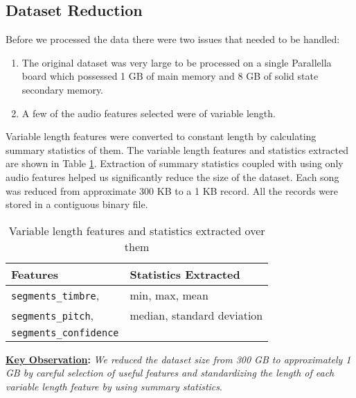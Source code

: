 \subsection{Dataset Reduction}
\label{subsec: meth_dataset_reduc}
Before we processed the data there were two issues that needed to be handled:
\begin{enumerate}
\item The original dataset was very large to be processed on a single Parallella board which possessed 1 GB of main memory and 8 GB of solid state secondary memory.
\item A few of the audio features selected were of variable length.
\end{enumerate}
Variable length features were converted to constant length by calculating summary statistics of them. The variable length features and statistics extracted are shown in Table \ref{table:varLenFeature_stats}. Extraction of summary statistics coupled with using only audio features helped us significantly reduce the size of the dataset. Each song was reduced from approximate 300 KB to a 1 KB record. All the records were stored in a contiguous binary file.
\begin{table}
\begin{center}
\begin{tabular}{| l | l |}
\hline
\textbf{Features} & \textbf{Statistics Extracted} \\
\hline
\texttt{segments\_timbre}, & min, max, mean\\
\texttt{segments\_pitch}, & median, standard deviation\\
\texttt{segments\_confidence} & \\
\hline
\end{tabular}
\caption{Variable length features and statistics extracted over them}
\label{table:varLenFeature_stats}
\end{center}
\end{table}

\textbf{\underline{Key Observation}: } \textit{We reduced the dataset size from 300 GB to approximately 1 GB by careful selection of useful features and standardizing the length of each variable length feature by using summary statistics}.
